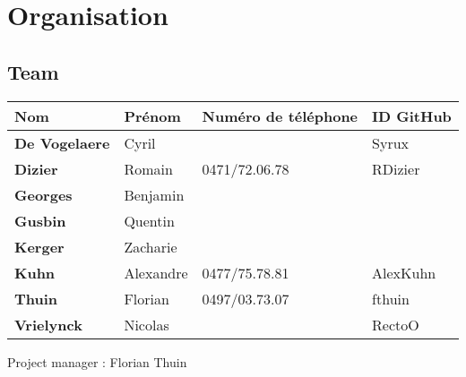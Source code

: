 \section{Organisation}

\subsection{Team}

\begin{tabular}{|l|l|l|l|}
    \hline
    Nom & Prénom & Numéro de téléphone & ID GitHub \\
    \hline
    \hline
    \textbf{De Vogelaere} & Cyril & & Syrux\\
    \hline
    \textbf{Dizier} & Romain & 0471/72.06.78 & RDizier\\
    \hline
    \textbf{Georges} & Benjamin & & \\
    \hline
    \textbf{Gusbin} & Quentin & & \\
    \hline
    \textbf{Kerger} & Zacharie & & \\
    \hline
    \textbf{Kuhn} & Alexandre & 0477/75.78.81 & AlexKuhn \\
    \hline
    \textbf{Thuin} & Florian & 0497/03.73.07 & fthuin\\
    \hline
    \textbf{Vrielynck} & Nicolas & & RectoO \\
    \hline
\end{tabular}

Project manager : Florian Thuin
